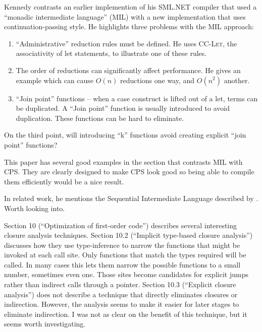 \documentclass[11pt]{article}
\begin{document}


\bigskip

Kennedy contrasts an earlier implemention of his SML.NET compiler that
used a ``monadic intermediate language'' (MIL) with a new
implementation that uses continuation-passing style. He highlights
three problems with the MIL approach:

\begin{enumerate}
\item ``Administrative'' reduction rules must be defined. He uses
  \textsc{CC-Let}, the associativity of let statements, to illustrate
  one of these rules.
\item The order of reductions can significantly affect performance. He
  gives an example which can cause $O(n)$ reductions one way, and
  $O(n^2)$ another.
\item ``Join point'' functions -- when a case construct is lifted out
  of a let, terms can be duplicated. A ``Join point'' function is
  usually introduced to avoid duplication. These functions can be hard
  to eliminate.
\end{enumerate}

On the third point, will introducing ``k'' functions avoid creating
explicit ``join point'' functions?

This paper has several good examples in the section that contrasts MIL
with CPS. They are clearly designed to make CPS look good so being
able to compile them efficiently would be a nice result.

In related work, he mentions the Sequential Intermediate Language described by
\citet{TOLMACH98FromML}. Worth looking into.

\bigskip
{}
\bigskip

Section 10 (``Optimization of first-order code'') describes several
interesting closure analysis techniques. Section 10.2 (``Implicit
type-based closure analysis'') discusses how they use type-inference
to narrow the functions that might be invoked at each call site. Only
functions that match the types required will be called. In many cases
this lets them narrow the possible functions to a small number,
sometimes even one. Those sites become candidates for explicit jumps
rather than indirect calls through a pointer. Section 10.3 (``Explicit
closure analysis'') does not describe a technique that directly
eliminates closures or indirection. However, the analysis seems to
make it easier for later stages to eliminate indirection. I was not as
clear on the benefit of this technique, but it seems worth
investigating.
\end{document}
